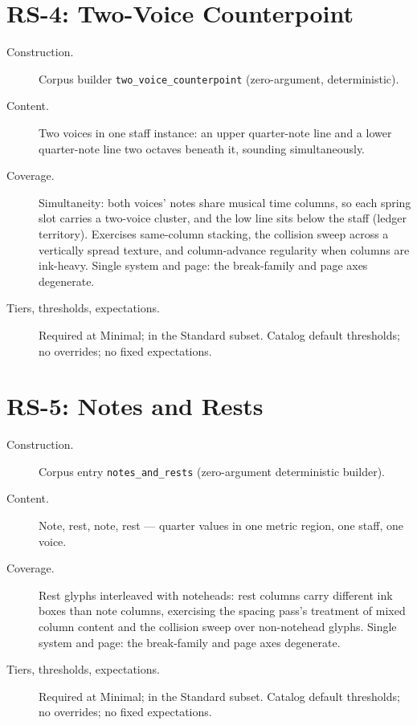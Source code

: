 \documentclass[11pt,letterpaper]{report}
\begin{document}
\section{RS-4: Two-Voice Counterpoint}
\label{sec:entries:rs4}

\begin{description}
  \item[Construction.] Corpus builder \texttt{two\_voice\_counterpoint}
    (zero-argument, deterministic).
  \item[Content.] Two voices in one staff instance: an upper quarter-note
    line and a lower quarter-note line two octaves beneath it, sounding
    simultaneously.
  \item[Coverage.] Simultaneity: both voices' notes share musical time
    columns, so each spring slot carries a two-voice cluster, and the
    low line sits below the staff (ledger territory). Exercises
    same-column stacking, the collision sweep across a vertically spread
    texture, and column-advance regularity when columns are ink-heavy.
    Single system and page: the break-family and page axes degenerate.
  \item[Tiers, thresholds, expectations.] Required at Minimal; in the
    Standard subset. Catalog default thresholds; no overrides; no fixed
    expectations.
\end{description}

\section{RS-5: Notes and Rests}
\label{sec:entries:rs5}

\begin{description}
  \item[Construction.] Corpus entry \texttt{notes\_and\_rests}
    (zero-argument deterministic builder).
  \item[Content.] Note, rest, note, rest --- quarter values in one metric
    region, one staff, one voice.
  \item[Coverage.] Rest glyphs interleaved with noteheads: rest columns
    carry different ink boxes than note columns, exercising the spacing
    pass's treatment of mixed column content and the collision sweep over
    non-notehead glyphs. Single system and page: the break-family and
    page axes degenerate.
  \item[Tiers, thresholds, expectations.] Required at Minimal; in the
    Standard subset. Catalog default thresholds; no overrides; no fixed
    expectations.
\end{description}
\end{document}
